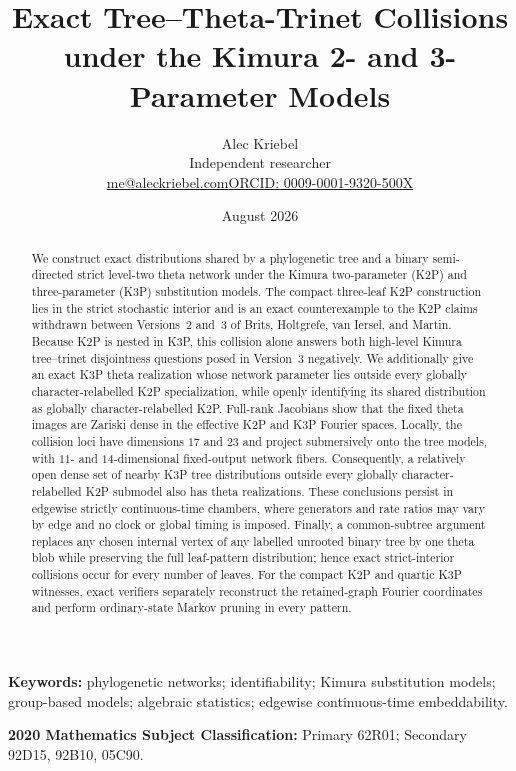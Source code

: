 \documentclass[11pt]{article}
\title{Exact Tree--Theta-Trinet Collisions\\under the Kimura 2- and 3-Parameter Models}
\author{Alec Kriebel\\[-1mm]\small Independent researcher\\[-1mm]\small\href{mailto:me@aleckriebel.com}{me@aleckriebel.com}\quad\textbar\quad\href{https://orcid.org/0009-0001-9320-500X}{ORCID: 0009-0001-9320-500X}}
\date{August 2026}
\theoremstyle{remark}\newtheorem{remark}[theorem]{Remark}
\begin{document}
\maketitle
\begin{abstract}
We construct exact distributions shared by a phylogenetic tree and a binary semi-directed strict level-two theta network under the Kimura two-parameter (K2P) and three-parameter (K3P) substitution models. The compact three-leaf K2P construction lies in the strict stochastic interior and is an exact counterexample to the K2P claims withdrawn between Versions~2 and~3 of Brits, Holtgrefe, van Iersel, and Martin. Because K2P is nested in K3P, this collision alone answers both high-level Kimura tree--trinet disjointness questions posed in Version~3 negatively. We additionally give an exact K3P theta realization whose network parameter lies outside every globally character-relabelled K2P specialization, while openly identifying its shared distribution as globally character-relabelled K2P. Full-rank Jacobians show that the fixed theta images are Zariski dense in the effective K2P and K3P Fourier spaces. Locally, the collision loci have dimensions $17$ and $23$ and project submersively onto the tree models, with $11$- and $14$-dimensional fixed-output network fibers. Consequently, a relatively open dense set of nearby K3P tree distributions outside every globally character-relabelled K2P submodel also has theta realizations. These conclusions persist in edgewise strictly continuous-time chambers, where generators and rate ratios may vary by edge and no clock or global timing is imposed. Finally, a common-subtree argument replaces any chosen internal vertex of any labelled unrooted binary tree by one theta blob while preserving the full leaf-pattern distribution; hence exact strict-interior collisions occur for every number of leaves. For the compact K2P and quartic K3P witnesses, exact verifiers separately reconstruct the retained-graph Fourier coordinates and perform ordinary-state Markov pruning in every pattern.
\end{abstract}
\noindent\textbf{Keywords:} phylogenetic networks; identifiability; Kimura substitution models; group-based models; algebraic statistics; edgewise continuous-time embeddability.

\medskip
\noindent\textbf{2020 Mathematics Subject Classification:} Primary 62R01; Secondary 92D15, 92B10, 05C90.
\end{document}
